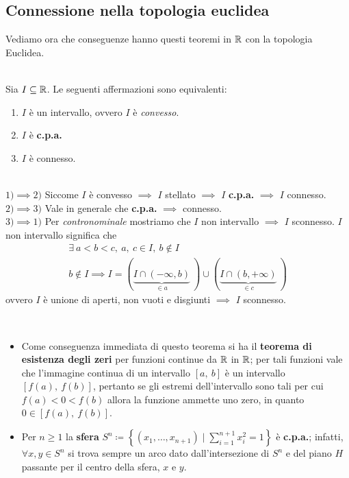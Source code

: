 \subsection{Connessione nella topologia euclidea}
Vediamo ora che conseguenze hanno questi teoremi in $\mathbb{R}$ con la topologia Euclidea.
\begin{theorema}~{}\\
	Sia $I\subseteq \mathbb{R}$. Le seguenti affermazioni sono equivalenti:
		\begin{enumerate}
	\item $I$ è un intervallo, ovvero $I$ è \textit{convesso}.
	\item $I$ è \textbf{c.p.a.}
	\item $I$ è connesso.
		\end{enumerate}
	\vspace{-3mm}
\end{theorema}
\begin{demonstration}~{}\\
	$1) \implies 2)$ Siccome $I$ è convesso $\implies$ $I$ stellato $\implies$ $I$ \textbf{c.p.a.} $\implies$ $I$ connesso. \\
	$2) \implies 3)$ Vale in generale che \textbf{c.p.a.} $\implies$ connesso.\\
	$3) \implies 1)$ Per \textit{contronominale} mostriamo che $I$ non intervallo $\implies$ $I$ sconnesso. $I$ non intervallo significa che
		\begin{gather*}
			\exists\ a<b<c,\ a,\ c\in I,\ b\notin I \\
			b\notin I \implies I= \left(\underbrace{ I\cap \left(-\infty ,b\right)}_{\in a}\ \right) \cup \left( \underbrace{I\cap \left(b ,+\infty\right)}_{\in c}\ \right)
		\end{gather*}
	ovvero $I$ è unione di aperti, non vuoti e disgiunti $\implies$ $I$ sconnesso.	
\end{demonstration}
\begin{observe}~{}\label{teorema esistenza zeri funzioni continue, s^n cpa}
		\begin{itemize}
	\item Come conseguenza immediata di questo teorema si ha il \textbf{teorema di esistenza degli zeri} per funzioni continue da $\mathbb{R}$ in $\mathbb{R}$; per tali funzioni vale che l'immagine continua di un intervallo $\left[a,\ b\right]$ è un intervallo $\left[f\left(a\right),\ f\left(b\right)\right]$, pertanto se gli estremi dell'intervallo sono tali per cui $f\left(a\right)<0<f\left(b\right)$ allora la funzione ammette uno zero, in quanto $0\in\left[f\left(a\right),\ f\left(b\right)\right]$.
	\item Per $n\geq 1$ la \textbf{sfera} $\displaystyle S^n \coloneqq \left\{ \left(x_1,\ldots,x_{n+1}\right) \mid \sum_{i=1}^{n+1}x_i^2=1 \right\}$ è \textbf{c.p.a.}; infatti, $\forall x,y\in S^n$ si trova sempre un arco dato dall'intersezione di $S^n$ e del piano $H$ passante per il centro della sfera, $x$ e $y$.
		\end{itemize}
	\vspace{-3mm}
\end{observe}
